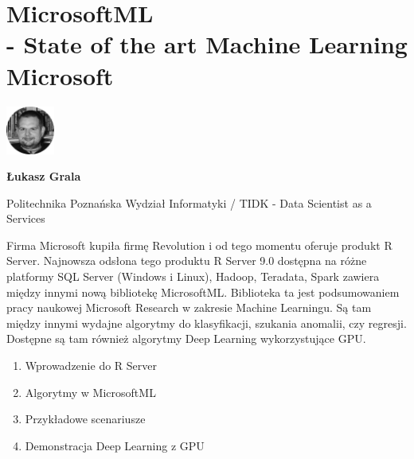 \documentclass[\main/boa.tex]{subfiles}
\begin{document}
\section[MicrosoftML - State of the art Machine Learning Microsoft]{MicrosoftML \\- State of the art Machine Learning Microsoft}
\begin{minipage}[t]{0.915\textwidth}
	\center     
    \includegraphics[width=60px]{img/workshops/czarno_biale/lgrala-crop.png} 
\end{minipage}

\begin{minipage}{0.915\textwidth}
\centering
{\bf {} Łukasz Grala}
\end{minipage}

\vskip 0.3cm

\begin{affiliations}
\begin{minipage}{0.915\textwidth}
\centering
\large Politechnika Poznańska Wydział Informatyki / TIDK - Data Scientist as a Services  \\[2pt]
\end{minipage}
\end{affiliations}

\vskip 0.8cm

\opiswarsztatu Firma Microsoft kupiła firmę Revolution i od tego momentu oferuje produkt R Server. Najnowsza odsłona tego produktu R Server 9.0 dostępna na różne platformy SQL Server (Windows i Linux), Hadoop, Teradata, Spark zawiera między innymi nową bibliotekę MicrosoftML. Biblioteka ta jest podsumowaniem pracy naukowej Microsoft Research w zakresie Machine Learningu. Są tam między innymi wydajne algorytmy do klasyfikacji, szukania anomalii, czy regresji. Dostępne są tam również algorytmy Deep Learning wykorzystujące GPU.

\planwarsztatu
\begin{enumerate}
\item Wprowadzenie do R Server
\item Algorytmy w MicrosoftML
\item Przykładowe scenariusze
\item Demonstracja Deep Learning z GPU
\end{enumerate}	 
\end{document}
